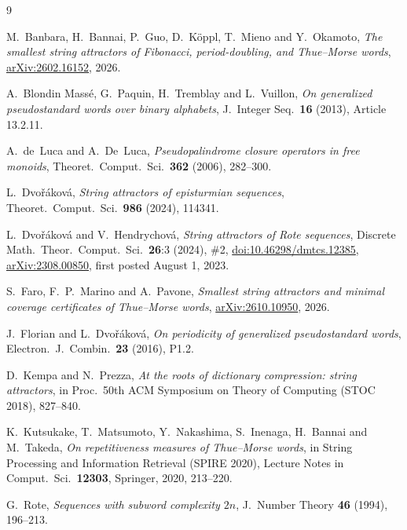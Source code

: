 \documentclass[11pt]{article}
\theoremstyle{remark}
\begin{document}
\begin{thebibliography}{9}

M.~Banbara, H.~Bannai, P.~Guo, D.~Köppl, T.~Mieno and Y.~Okamoto,
\emph{The smallest string attractors of Fibonacci, period-doubling, and
Thue--Morse words}, \href{https://arxiv.org/abs/2602.16152}{arXiv:2602.16152}, 2026.

A.~Blondin Massé, G.~Paquin, H.~Tremblay and L.~Vuillon,
\emph{On generalized pseudostandard words over binary alphabets},
J.\ Integer Seq.\ \textbf{16} (2013), Article 13.2.11.

A.~de~Luca and A.~De~Luca,
\emph{Pseudopalindrome closure operators in free monoids},
Theoret.\ Comput.\ Sci.\ \textbf{362} (2006), 282--300.

L.~Dvořáková,
\emph{String attractors of episturmian sequences},
Theoret.\ Comput.\ Sci.\ \textbf{986} (2024), 114341.

L.~Dvořáková and V.~Hendrychová,
\emph{String attractors of Rote sequences},
Discrete Math.\ Theor.\ Comput.\ Sci.\ \textbf{26}:3 (2024), \#2,
\href{https://doi.org/10.46298/dmtcs.12385}{doi:10.46298/dmtcs.12385},
\href{https://arxiv.org/abs/2308.00850}{arXiv:2308.00850}, first posted August 1, 2023.

S.~Faro, F.~P.~Marino and A.~Pavone,
\emph{Smallest string attractors and minimal coverage certificates of
Thue--Morse words}, \href{https://arxiv.org/abs/2610.10950}{arXiv:2610.10950}, 2026.

J.~Florian and L.~Dvořáková,
\emph{On periodicity of generalized pseudostandard words},
Electron.\ J.\ Combin.\ \textbf{23} (2016), P1.2.

D.~Kempa and N.~Prezza,
\emph{At the roots of dictionary compression: string attractors},
in Proc.\ 50th ACM Symposium on Theory of Computing (STOC 2018), 827--840.

K.~Kutsukake, T.~Matsumoto, Y.~Nakashima, S.~Inenaga, H.~Bannai and M.~Takeda,
\emph{On repetitiveness measures of Thue--Morse words},
in String Processing and Information Retrieval (SPIRE 2020),
Lecture Notes in Comput.\ Sci.\ \textbf{12303}, Springer, 2020, 213--220.

G.~Rote,
\emph{Sequences with subword complexity $2n$},
J.\ Number Theory \textbf{46} (1994), 196--213.

\end{thebibliography}
\end{document}
